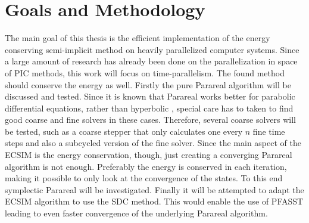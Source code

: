 \section{Goals and Methodology}
\label{sec:goals and methodology}
The main goal of this thesis is the efficient implementation of the energy conserving semi-implicit method on heavily parallelized computer systems. Since a large amount of research has already been done on the parallelization in space of PIC methods, this work will focus on time-parallelism. The found method should conserve the energy as well. Firstly the pure Parareal algorithm will be discussed and tested. Since it is known that Parareal works better for parabolic differential equations, rather than hyperbolic \cite{gander_analysis_2007}, special care has to taken to find good coarse and fine solvers in these cases. Therefore, several coarse solvers will be tested, such as a coarse stepper that only calculates one every $n$ fine time steps and also a subcycled version of the fine solver. Since the main aspect of the ECSIM is the energy conservation, though, just creating a converging Parareal algorithm is not enough. Preferably the energy is conserved in each iteration, making it possible to only look at the convergence of the states. To this end symplectic Parareal will be investigated. Finally it will be attempted to adapt the ECSIM algorithm to use the SDC method. This would enable the use of PFASST leading to even faster convergence of the underlying Parareal algorithm.


